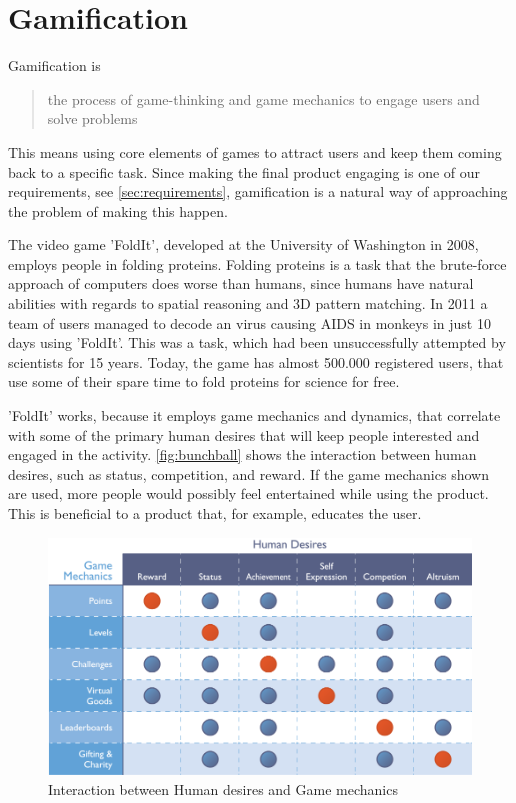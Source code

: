 \section{Gamification}
\label{sec:gamification}
Gamification is 
\begin{quote}
	the process of game-thinking and game mechanics to engage users and solve problems \cite{Zichermann2011}
\end{quote}
This means using core elements of games to attract users and keep them coming back to a specific task.
Since making the final product engaging is one of our requirements, see \autoref{sec:requirements}, gamification is a natural way of approaching the problem of making this happen.\newline

The video game 'FoldIt', developed at the University of Washington in 2008, employs people in folding proteins.
Folding proteins is a task that the brute-force approach of computers does worse than humans, since humans have natural abilities with regards to spatial reasoning and 3D pattern matching.
In 2011 a team of users managed to decode an virus causing AIDS in monkeys in just 10 days using 'FoldIt'.
This was a task, which had been unsuccessfully attempted by scientists for 15 years.\cite{Huff2011}
Today, the game has almost 500.000 registered users, that use some of their spare time to fold proteins for science for free.\cite{FoldIt2013}\newline

'FoldIt' works, because it employs game mechanics and dynamics, that correlate with some of the primary human desires that will keep people interested and engaged in the activity.
\autoref{fig:bunchball} shows the interaction between human desires, such as status, competition, and reward.
If the game mechanics shown are used, more people would possibly feel entertained while using the product.
This is beneficial to a product that, for example, educates the user. 

\begin{figure}[h]
  \centering
    \includegraphics[width=\textwidth]{img/bunchball.png}
  \caption{Interaction between Human desires and Game mechanics}
  \label{fig:bunchball}
\end{figure}

